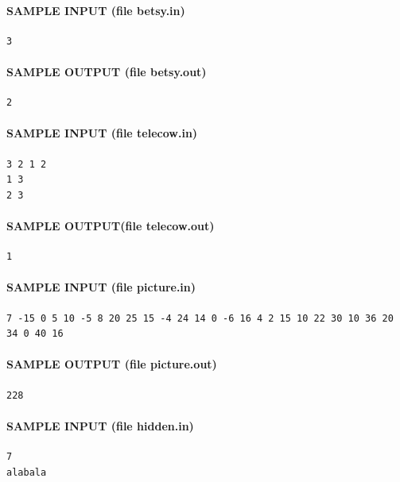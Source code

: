 \documentclass[11pt]{article}
\begin{document}
\paragraph{SAMPLE INPUT (file betsy.in)}
\begin{verbatim}
3
\end{verbatim}

\paragraph{SAMPLE OUTPUT (file betsy.out)}
\begin{verbatim}
2
\end{verbatim}

\paragraph{SAMPLE INPUT (file telecow.in)}
\begin{verbatim}
3 2 1 2
1 3
2 3
\end{verbatim}

\paragraph{SAMPLE OUTPUT(file telecow.out)}
\begin{verbatim}
1
\end{verbatim}

\paragraph{SAMPLE INPUT (file picture.in)}
\begin{verbatim}
7 -15 0 5 10 -5 8 20 25 15 -4 24 14 0 -6 16 4 2 15 10 22 30 10 36 20 34 0 40 16
\end{verbatim}

\paragraph{SAMPLE OUTPUT (file picture.out)}
\begin{verbatim}
228
\end{verbatim}

\paragraph{SAMPLE INPUT (file hidden.in)}
\begin{verbatim}
7
alabala
\end{verbatim}
\end{document}
